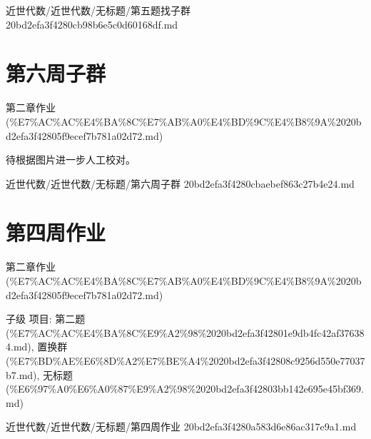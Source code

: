 \begin{note}[来源路径]

近世代数/近世代数/无标题/第五题找子群 20bd2efa3f4280cb98b6e5c0d60168df.md

\end{note}

\section*{第六周子群}

\begin{note}[来源上级主题]

第二章作业 (\%E7\%AC\%AC\%E4\%BA\%8C\%E7\%AB\%A0\%E4\%BD\%9C\%E4\%B8\%9A\%2020bd2efa3f42805f9ecef7b781a02d72.md)

\end{note}

\begin{homework}

待根据图片进一步人工校对。

\end{homework}

\begin{note}[来源路径]

近世代数/近世代数/无标题/第六周子群 20bd2efa3f4280cbaebef863c27b4e24.md

\end{note}

\section*{第四周作业}

\begin{note}[来源上级主题]

第二章作业 (\%E7\%AC\%AC\%E4\%BA\%8C\%E7\%AB\%A0\%E4\%BD\%9C\%E4\%B8\%9A\%2020bd2efa3f42805f9ecef7b781a02d72.md)

\end{note}

\begin{homework}

子级 项目: 第二题 (\%E7\%AC\%AC\%E4\%BA\%8C\%E9\%A2\%98\%2020bd2efa3f42801e9db4fc42af376384.md), 置换群 (\%E7\%BD\%AE\%E6\%8D\%A2\%E7\%BE\%A4\%2020bd2efa3f42808c9256d550e77037b7.md), 无标题 (\%E6\%97\%A0\%E6\%A0\%87\%E9\%A2\%98\%2020bd2efa3f42803bb142e695e45bf369.md)

\end{homework}

\begin{note}[来源路径]

近世代数/近世代数/无标题/第四周作业 20bd2efa3f4280a583d6e86ac317e9a1.md

\end{note}

